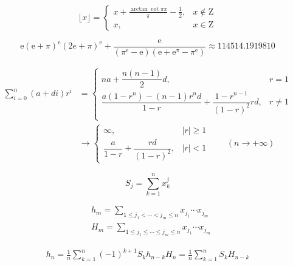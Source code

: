 \begin{equation}
    \lfloor x\rfloor=\begin{cases}
        \displaystyle x+\frac{\arctan\cot\pi x}{\pi}-\frac{1}{2}, & x\notin\mathrm{Z} \\
        x,                                                        & x\in\mathrm{Z}
    \end{cases}
\end{equation}

\begin{equation}
    \mathrm{e}(\mathrm{e}+\pi)^\mathrm{e}(2e + \pi)^\mathrm{e}+\frac{\mathrm{e}}{(\pi^\mathrm{e}-\mathrm{e})(\mathrm{e}+\mathrm{e}^\pi-\pi^\mathrm{e})}\approx 114514.1919810
\end{equation}

\begin{equation}
    \begin{aligned}
        \sum_{i=0}^n(a+di)r^i & =\begin{cases}
                                     na+\dfrac{n(n-1)}{2}d,                                        & r=1    \\
                                     \dfrac{a(1-r^n)-(n-1)r^nd}{1-r}+\dfrac{1-r^{n-1}}{(1-r)^2}rd, & r\ne 1 \\
                                 \end{cases} \\
                              & \to\begin{cases}
                                       \infty,                             & |r|\geq 1 \\
                                       \dfrac{a}{1-r}+\dfrac{rd}{(1-r)^2}, & |r|<1
                                   \end{cases}\qquad(n\to+\infty)
    \end{aligned}
\end{equation}

\begin{equation}
    S_j = \sum_{k=1}^nx_k^j 
\end{equation}

\begin{eqnarray}
    &h_m = \sum_{1\leq j_1 < \cdots < j_m \leq n} x_{j_1}\cdots x_{j_m}\\
    &H_m = \sum_{1\leq j_1 \leq \cdots \leq j_m \leq n} x_{j_1}\cdots x_{j_m}
\end{eqnarray}

\begin{eqnarray}
    h_n = \frac{1}{n}\sum_{k=1}^n(-1)^{k+1}S_kh_{n-k} 
    H_n = \frac{1}{n}\sum_{k=1}^nS_kH_{n-k} 
\end{eqnarray}

